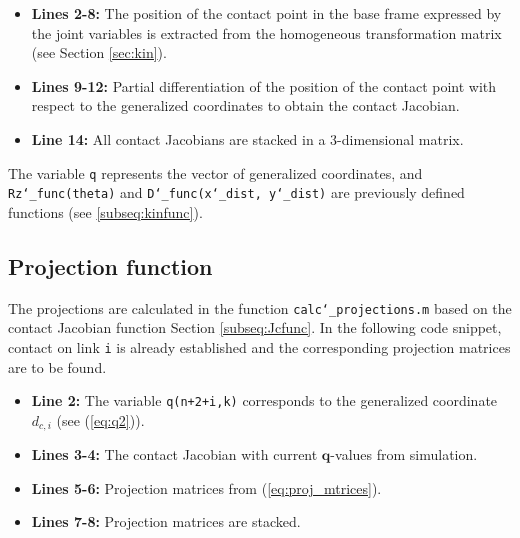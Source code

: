 \begin{itemize}
    \item \textbf{Lines 2-8:} The position of the contact point in the base frame expressed by the joint variables is extracted from the homogeneous transformation matrix (see Section \ref{sec:kin}).
    \item\textbf{Lines 9-12:} Partial differentiation of the position of the contact point with respect to the generalized coordinates to obtain the contact Jacobian.
    \item \textbf{Line 14:} All contact Jacobians are stacked in a 3-dimensional matrix.
\end{itemize}

The variable \texttt{q} represents the vector of generalized coordinates, and \\ \texttt{Rz\char`_func(theta)} and \texttt{D\char`_func(x\char`_dist, y\char`_dist)} are previously defined functions (see \ref{subseq:kinfunc}).




\subsection{Projection function}

The projections are calculated in the function \texttt{calc\char`_projections.m} based on the contact Jacobian function Section \ref{subseq:Jcfunc}. 
In the following code snippet, contact on link \texttt{i} is already established and the corresponding projection matrices are to be found.

\begin{itemize}
    \item \textbf{Line 2:} The variable \texttt{q(n+2+i,k)} corresponds to the generalized coordinate $d_{c,i}$ (see (\ref{eq:q2})).
    \item \textbf{Lines 3-4:} The contact Jacobian with current $\mathbf{q}$-values from simulation.
    \item \textbf{Lines 5-6:} Projection matrices from (\ref{eq:proj_mtrices}).
    \item \textbf{Lines 7-8:} Projection matrices are stacked.
\end{itemize}


